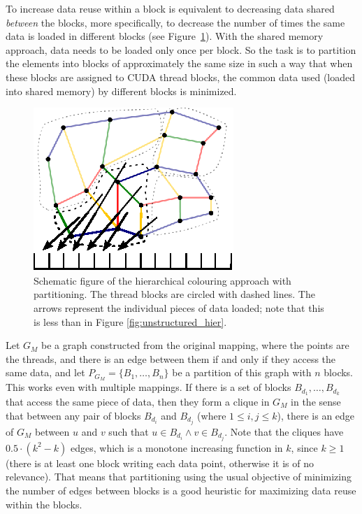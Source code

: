 \noindent To increase data reuse within a block is equivalent to decreasing 
data shared \emph{between} the blocks, more specifically, to decrease the 
number of times the same data is loaded in different blocks (see 
Figure~\ref{fig:unstructured_part}). With the shared memory approach, data needs 
to be loaded only once per block. So the task is to partition the elements into 
blocks of approximately the same size in such a way that when these blocks are 
assigned to CUDA thread blocks, the common data used (loaded into shared 
memory) by different blocks is minimized.

\begin{figure}[Htpb]
  \centering
  \includegraphics{fig/svg/unstructured_part.eps}
  \caption{Schematic figure of the hierarchical colouring approach with
  partitioning. The thread blocks are circled with dashed lines. The arrows
  represent the individual pieces of data loaded; note that this is less than
  in Figure \ref{fig:unstructured_hier}.}
  \label{fig:unstructured_part}
\end{figure}

Let $G_M$ be a graph constructed from the original mapping, where the points are
the threads, and there is an edge between them if and only if they access the
same data, and let $P_{G_M} = \{B_1, \ldots, B_n\}$ be a partition of this graph
with $n$ blocks. This works even with multiple mappings. If there is a set of 
blocks $B_{d_1}, \ldots, B_{d_k}$ that access the same piece of data, then they 
form a clique in $G_M$ in the sense that between any pair of blocks $B_{d_i}$ 
and $B_{d_j}$ (where $1 \le i,j \le k$), there is an edge of $G_M$ between $u$ 
and $v$ such that $u \in B_{d_i} \wedge v \in B_{d_j}$. Note that the cliques 
have $0.5 \cdot (k^2 - k)$ edges, which is a monotone increasing function in 
$k$, since $k \ge 1$ (there is at least one block writing each data point, 
otherwise it is of no relevance). That means that partitioning using the usual 
objective of minimizing the number of edges between blocks is a good heuristic 
for maximizing data reuse within the blocks.

